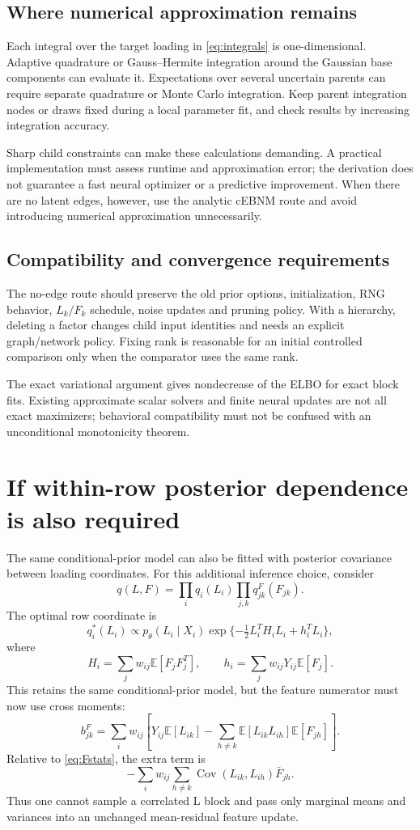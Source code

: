 \documentclass[11pt,a4paper]{article}
\newcommand{\E}{\mathbb E}
\newcommand{\Cov}{\operatorname{Cov}}
\begin{document}
\subsection{Where numerical approximation remains}
Each integral over the target loading in \eqref{eq:integrals} is
one-dimensional. Adaptive quadrature or Gauss--Hermite integration around
the Gaussian base components can evaluate it. Expectations over several
uncertain parents can require separate quadrature or Monte Carlo integration.
Keep parent integration nodes or draws fixed during a local parameter fit,
and check results by increasing integration accuracy.

Sharp child constraints can make these calculations demanding. A practical
implementation must assess runtime and approximation error; the derivation
does not guarantee a fast neural optimizer or a predictive improvement.
When there are no latent edges, however, use the analytic cEBNM route and
avoid introducing numerical approximation unnecessarily.

\subsection{Compatibility and convergence requirements}
The no-edge route should preserve the old prior options, initialization,
RNG behavior, \(L_k/F_k\) schedule, noise updates and pruning policy. With a
hierarchy, deleting a factor changes child input identities and needs an
explicit graph/network policy. Fixing rank is reasonable for an initial
controlled comparison only when the comparator uses the same rank.

The exact variational argument gives nondecrease of the ELBO for exact
block fits. Existing approximate scalar solvers and finite neural updates
are not all exact maximizers; behavioral compatibility must not be confused
with an unconditional monotonicity theorem.

\clearpage
\section{If within-row posterior dependence is also required}
\label{sec:structured}
The same conditional-prior model can also be fitted with posterior covariance
between loading coordinates. For this additional inference choice, consider
\[
q(L,F)=\prod_iq_i(L_i)\prod_{j,k}q^F_{jk}(F_{jk}).
\]
The optimal row coordinate is
\begin{equation}
q_i^*(L_i)\propto p_\theta(L_i\mid X_i)
\exp\{-\tfrac12L_i^TH_iL_i+h_i^TL_i\},
\label{eq:rowblock}
\end{equation}
where
\[
H_i=\sum_jw_{ij}\E[F_jF_j^T],\qquad
h_i=\sum_jw_{ij}Y_{ij}\E[F_j].
\]
This retains the same conditional-prior model, but the feature numerator
must now use cross moments:
\begin{equation}
b^F_{jk}=\sum_iw_{ij}\left[
Y_{ij}\E[L_{ik}]-\sum_{h\ne k}\E[L_{ik}L_{ih}]\E[F_{jh}]\right].
\label{eq:cross}
\end{equation}
Relative to \eqref{eq:Fstats}, the extra term is
\[
-\sum_iw_{ij}\sum_{h\ne k}\Cov(L_{ik},L_{ih})\bar F_{jh}.
\]
Thus one cannot sample a correlated L block and pass only marginal means
and variances into an unchanged mean-residual feature update.
\end{document}
